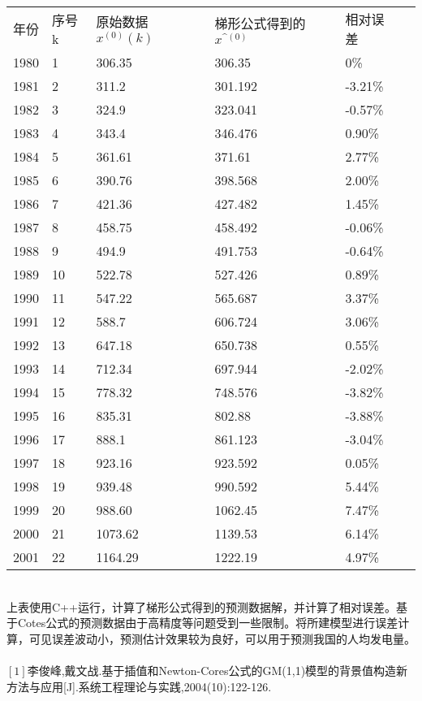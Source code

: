 \documentclass[twocolumn]{ctexart}
\renewcommand*{\songti}{\CJKfamily{zhsong}}%
\begin{document}
		\begin{tabular*}{\linewidth}{lp{1cm}p{2cm}p{2cm}p{2cm}p{1cm}}
		\toprule[1.5pt]
		年份 & 序号k & 原始数据$x^{(0)}(k)$ & 梯形公式得到的$x^{\^{}(0)}$ & 相对误差 \\
		1980 &  1   &     306.35 & 306.35 & 0\% \\
		1981 &  2   &     311.2 & 301.192 & -3.21\% \\
		1982 &  3   &     324.9 & 323.041 & -0.57\% \\
		1983 &  4   &     343.4 & 346.476 & 0.90\% \\
		1984 &  5   &     361.61 & 371.61 & 2.77\% \\
		1985 &  6   &     390.76 & 398.568 & 2.00\% \\
		1986 &  7   &     421.36 & 427.482 & 1.45\% \\
		1987 &  8   &     458.75 & 458.492 & -0.06\% \\
		1988 &  9   &     494.9 & 491.753 & -0.64\% \\
		1989 &  10  &     522.78 & 527.426 & 0.89\% \\
		1990 &  11  &     547.22 & 565.687 & 3.37\% \\
		1991 &  12  &     588.7 & 606.724 & 3.06\% \\
		1992 &  13  &     647.18 & 650.738 & 0.55\% \\
		1993 &  14  &     712.34 & 697.944 & -2.02\% \\
		1994 &  15  &     778.32 & 748.576 & -3.82\% \\
		1995 &  16  &     835.31 & 802.88 & -3.88\% \\
		1996 &  17  &     888.1 & 861.123 & -3.04\% \\
		1997 &  18  &     923.16 & 923.592 & 0.05\% \\
		1998 &  19  &     939.48 & 990.592 & 5.44\% \\
		1999 &  20  &     988.60 & 1062.45 & 7.47\% \\
		2000 &  21  &     1073.62 & 1139.53 & 6.14\% \\
		2001 &  22  &     1164.29 & 1222.19 & 4.97\% \\
		\bottomrule[1.5pt]
	\end{tabular*}   \\

	上表使用C++运行，计算了梯形公式得到的预测数据解，并计算了相对误差。基于Cotes公式的预测数据由于高精度等问题受到一些限制。将所建模型进行误差计算，可见误差波动小，预测估计效果较为良好，可以用于预测我国的人均发电量。 \\
		
	\noindent\textbf{\songti {\zihao{-3} 参考文献}}\\%
	
	$\left[1\right]$李俊峰,戴文战.基于插值和Newton-Cores公式的GM(1,1)模型的背景值构造新方法与应用[J].系统工程理论与实践,2004(10):122-126.\\
\end{document}
